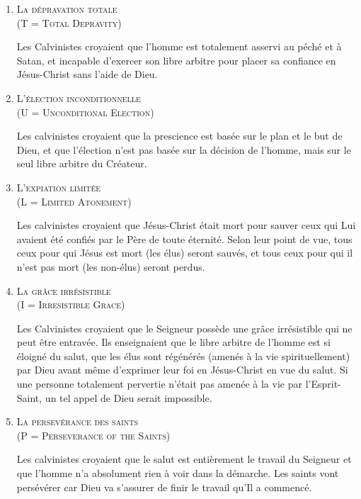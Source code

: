 \begin{enumerate}

  \item  \textsc{La dépravation totale\\\nobreak (\og T \fg{} = Total Depravity)}

\nobreak
Les Calvinistes croyaient que l'hom\-me est totalement 
 asservi au péché  et à Satan,
 et incapable d'exercer son libre arbitre 
 pour placer sa confiance en Jésus-Christ sans l'aide de Dieu.

  \item  \textsc{L'élection inconditionnelle\\\nobreak (\og U \fg{} = Unconditional Election)}

\nobreak
Les calvinistes croyaient que la prescience 
 est basée sur le plan et le but de Dieu, et que l'élection
 n'est pas basée sur la décision de l'homme, mais sur le seul \og libre arbitre \fg{}
 du Créateur.

\pocketpagebreak
  \item  \textsc{L'expiation limitée\\\nobreak (\og L \fg{} = Limited Atonement)}

\nobreak
Les calvinistes croyaient que Jésus-Christ était mort pour sauver
 ceux qui Lui avaient été confiés par le Père de toute éternité.
 Selon leur point de vue, tous ceux pour qui Jésus est mort (les élus) seront sauvés,
 et tous ceux pour qui il n'est pas mort (les non-élus) seront perdus.

  \item  \textsc{La grâce irrésistible\\\nobreak (\og I \fg{} = Irresistible Grace)}

\nobreak
Les Calvinistes croyaient que le Seigneur possède une grâce irrésistible
 qui ne peut être entravée. Ils enseignaient que le libre arbitre de l'hom\-me
 est si éloigné du salut, que les élus sont régénérés (amenés à la vie spirituellement)
 par Dieu avant \pocketlinebreak
 même d'exprimer leur foi en Jésus-Christ en vue du salut.
 Si une personne totalement pervertie n'était pas amenée à la vie par l'Esprit-\pocketlinebreak{}Saint,
 un tel appel de Dieu serait impossible.

  \item  \textsc{La persevérance des saints\\\nobreak (\og P \fg{} = Perseverance of the Saints)}

\nobreak
Les calvinistes croyaient que le salut est entièrement le travail du Seigneur
 et que l'homme n'a absolument rien à voir dans la démarche.
 Les saints vont persévérer car Dieu va s'assurer de finir le travail
 qu'Il a commencé.

\end{enumerate}


\closechapter
